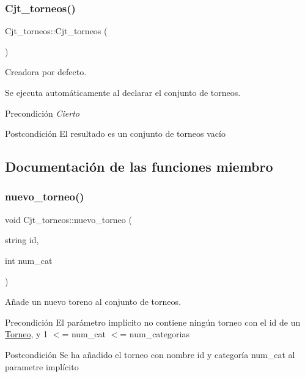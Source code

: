 \subsubsection{\texorpdfstring{Cjt\+\_\+torneos()}{Cjt\_torneos()}}
{\footnotesize\ttfamily Cjt\+\_\+torneos\+::\+Cjt\+\_\+torneos (\begin{DoxyParamCaption}{ }\end{DoxyParamCaption})}



Creadora por defecto. 

Se ejecuta automáticamente al declarar el conjunto de torneos. \begin{DoxyPrecond}{Precondición}
{\itshape Cierto} 
\end{DoxyPrecond}
\begin{DoxyPostcond}{Postcondición}
El resultado es un conjunto de torneos vacío 
\end{DoxyPostcond}


\subsection{Documentación de las funciones miembro}
\mbox{\label{class_cjt__torneos_a8e0f1049c3d772d63b3aefd885677ee3}} 
\subsubsection{\texorpdfstring{nuevo\+\_\+torneo()}{nuevo\_torneo()}}
{\footnotesize\ttfamily void Cjt\+\_\+torneos\+::nuevo\+\_\+torneo (\begin{DoxyParamCaption}\item[{string}]{id,  }\item[{int}]{num\+\_\+cat }\end{DoxyParamCaption})}



Añade un nuevo toreno al conjunto de torneos. 

\begin{DoxyPrecond}{Precondición}
El parámetro implícito no contiene ningún torneo con el id de un \hyperlink{class_torneo}{Torneo}, y 1 $<$= num\+\_\+cat $<$= num\+\_\+categorias 
\end{DoxyPrecond}
\begin{DoxyPostcond}{Postcondición}
Se ha añadido el torneo con nombre id y categoría num\+\_\+cat al parametre implícito 
\end{DoxyPostcond}
\mbox{\label{class_cjt__torneos_aa4a23ce93b31fe6c29b9b3a1fee2393a}} 
